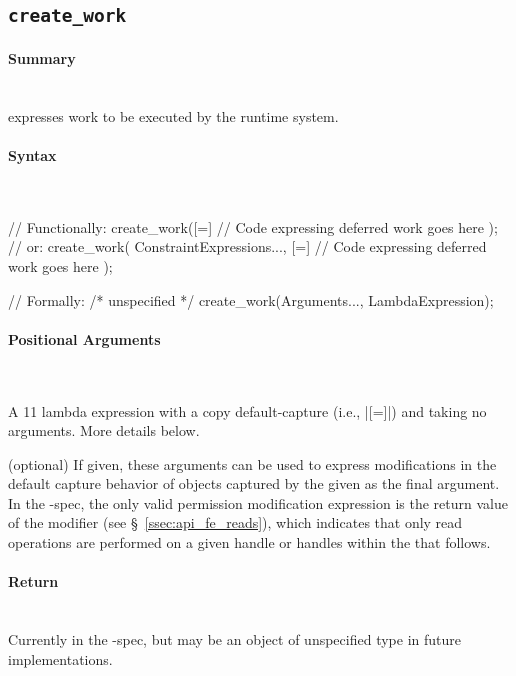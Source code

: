 \subsection{\texttt{create\_work}}
\label{ssec:api_fe_cw}

\paragraph{Summary}\mbox{}\\
 expresses work to be executed by the \gls{runtime
system}.

\paragraph{Syntax}\mbox{}\\
\begin{CppCode}
// Functionally:
create_work([=]{
  // Code expressing deferred work goes here
});
// or:
create_work(
  ConstraintExpressions..., 
  [=]{
    // Code expressing deferred work goes here
  }
);

// Formally:
/* unspecified */ create_work(Arguments..., LambdaExpression);
\end{CppCode}

\paragraph{Positional Arguments}\mbox{}\\
\begin{compactitem}
  \item {} A \CC{}11 lambda expression with a copy
    default-\gls{capture} (i.e., |[=]|) and taking no arguments.  More details
  below.
\item {} (optional) If given, these
  arguments can be used to express modifications in the default capture behavior
  of  objects captured by the 
  given as the final argument.  In the \specVersion-spec, the only valid permission
  modification expression is the return value of the  modifier
  (see \S~\ref{ssec:api_fe_reads}), which indicates that only read operations
  are performed on a given \gls{handle} or \glspl{handle} within the
   that follows.
\end{compactitem}


\paragraph{Return}\mbox{}\\
Currently  in the \specVersion-spec, but may be an object of unspecified
type in future implementations.

